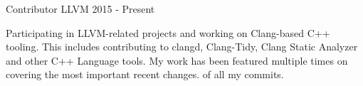 
\begin{cventries}

  \cventry
    {Contributor}
    {LLVM}
    {}
    {2015 - Present}
    {
      \begin{cvitems}
        Participating in LLVM-related projects and working on Clang-based C++
        tooling. This includes contributing to clangd, Clang-Tidy, Clang Static
        Analyzer and other C++ Language tools. My work has been featured
        multiple times on  covering
        the most important recent changes.
        of all my commits.
      \end{cvitems}
    }

\end{cventries}
